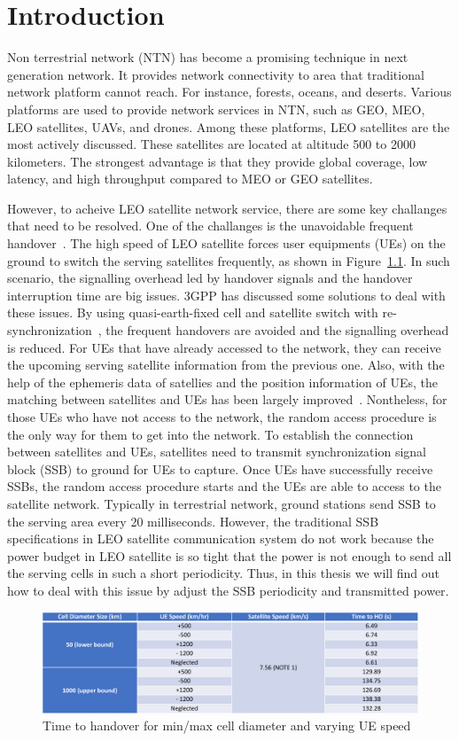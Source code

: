 \chapter{Introduction}
\label{chap:introduction}


Non terrestrial network (NTN) has become a promising technique in next generation network. It provides network connectivity to area that traditional network platform cannot reach. For instance, forests, oceans, and deserts. Various platforms are used to provide network services in NTN, such as GEO, MEO, LEO satellites, UAVs, and drones. Among these platforms, LEO satellites are the most actively discussed. These satellites are located at altitude 500 to 2000 kilometers. The strongest advantage is that they provide global coverage, low latency, and high throughput compared to MEO or GEO satellites.

However, to acheive LEO satellite network service, there are some key challanges that need to be resolved. One of the challanges is the unavoidable frequent handover~\cite{38821}. The high speed of LEO satellite forces user equipments (UEs) on the ground to switch the serving satellites frequently, as shown in Figure~\ref{time to ho}. In such scenario, the signalling overhead led by handover signals and the handover interruption time are big issues. 3GPP has discussed some solutions to deal with these issues. By using quasi-earth-fixed cell and satellite switch with re-synchronization~\cite{38300}, the frequent handovers are avoided and the signalling overhead is reduced. For UEs that have already accessed to the network, they can receive the upcoming serving satellite information from the previous one. Also, with the help of the ephemeris data of satellies and the position information of UEs, the matching between satellites and UEs has been largely improved~\cite{38331}. Nontheless, for those UEs who have not access to the network, the random access procedure is the only way for them to get into the network. To establish the connection between satellites and UEs, satellites need to transmit synchronization signal block (SSB) to ground for UEs to capture. Once UEs have successfully receive SSBs, the random access procedure starts and the UEs are able to access to the satellite network. Typically in terrestrial network, ground stations send SSB to the serving area every 20 milliseconds. However, the traditional SSB specifications in LEO satellite communication system do not work because the power budget in LEO satellite is so tight that the power is not enough to send all the serving cells in such a short periodicity. Thus, in this thesis we will find out how to deal with this issue by adjust the SSB periodicity and transmitted power. 

\begin{figure}[h!]
    \centering
    \includegraphics[width=1\textwidth]{figure/time to ho.pdf}
    \caption{Time to handover for min/max cell diameter and varying UE speed}
    \label{time to ho}
\end{figure}